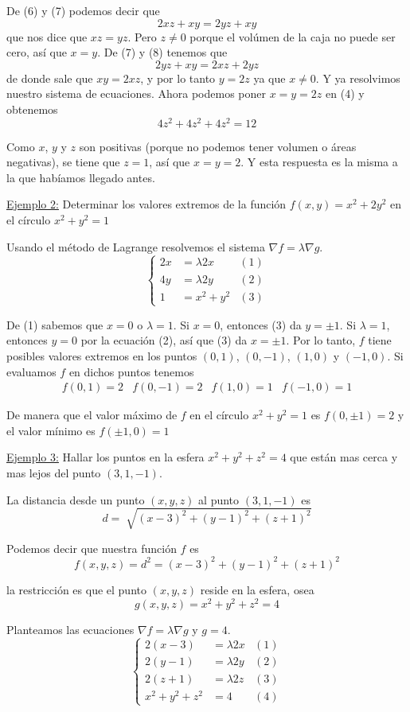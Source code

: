 \documentclass[12pt]{article}
\begin{document}
De (6) y (7) podemos decir que 
\[
  2xz + xy = 2yz + xy
\]
que nos dice que $ xz=yz $. Pero $ z\neq 0 $ porque el volúmen de la caja no puede ser cero, así que $ x=y $. De (7) y (8) tenemos que
\[
  2yz + xy = 2xz + 2yz
\]
de donde sale que $ xy=2xz $, y por lo tanto $ y=2z $ ya que $ x\neq 0 $. Y ya resolvimos nuestro sistema de ecuaciones. Ahora podemos poner $ x=y=2z $ en (4) y obtenemos
\[
  4z^2+4z^2+4z^2 = 12
\]

Como $ x $, $ y $ y $ z $ son positivas (porque no podemos tener volumen o áreas negativas), se tiene que $ z=1 $, así que $ x=y=2 $. Y esta respuesta es la misma a la que habíamos llegado antes.

\underline{Ejemplo 2:} Determinar los valores extremos de la función $ f(x,y)=x^2+2y^2 $ en el círculo $ x^2+y^2=1 $

Usando el método de Lagrange resolvemos el sistema $ \nabla f = \lambda \nabla g $.
\[
  \left\{
  \begin{aligned}
	  2x &= \lambda 2x & (1) \\
	  4y &= \lambda 2y & (2) \\
	  1 &= x^2 + y^2 & (3)
  \end{aligned}
  \right.
\]

De (1) sabemos que $ x=0 $ o $ \lambda = 1 $. Si $ x=0 $, entonces (3) da $ y=\pm 1 $. Si $ \lambda = 1 $, entonces $ y=0 $ por la ecuación (2), así que (3) da $ x=\pm1 $. Por lo tanto, $ f $ tiene posibles valores extremos en los puntos $ (0,1) $, $ (0,-1) $, $ (1,0) $ y $ (-1,0) $. Si evaluamos $ f $ en dichos puntos tenemos 
\begin{align*}
  f(0,1) = 2 & f(0,-1)=2 & f(1,0)=1 & f(-1,0) = 1
\end{align*}

De manera que el valor máximo de $ f $ en el círculo $ x^2+y^2=1 $ es $ f(0,\pm1)=2 $ y el valor mínimo es $ f(\pm1,0)=1 $

\underline{Ejemplo 3:} Hallar los puntos en la esfera $ x^2+y^2+z^2=4 $ que están mas cerca y mas lejos del punto $ (3,1,-1) $.

La distancia desde un punto $ (x,y,z) $ al punto $ (3,1,-1) $ es 
\[
  d=\sqrt[]{(x-3)^2+(y-1)^2+(z+1)^2}
\]

Podemos decir que nuestra función $ f $ es
\[
  f(x,y,z)=d^2=(x-3)^2+(y-1)^2+(z+1)^2
\]

la restricción es que el punto $ (x,y,z) $ reside en la esfera, osea
\[
  g(x,y,z)=x^2+y^2+z^2=4
\]

Planteamos las ecuaciones $ \nabla f=\lambda \nabla g $ y $ g=4 $.
\[
  \left\{
  \begin{aligned}
	  2(x-3) &= \lambda 2x & (1) \\
	  2(y-1) &= \lambda 2y & (2) \\
	  2(z+1) &= \lambda 2z & (3) \\
	  x^2 + y^2 + z^2 &= 4 & (4)
  \end{aligned}
\right.
\]
\end{document}
